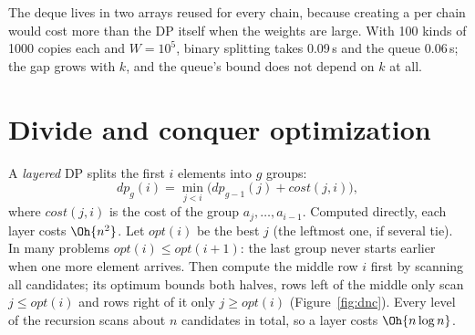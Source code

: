 The deque lives in two arrays reused for every chain, because creating a  per chain would cost more than the DP itself
when the weights are large. With 100 kinds of 1000 copies each and $W = 10^5$, binary splitting takes 0.09\,s and the queue 0.06\,s;
the gap grows with $k$, and the queue's bound does not depend on $k$ at all.

\section[Divide and conquer optimization]{Divide and conquer optimization \hfill \plat}\label{sec:dnc}

A \emph{layered} DP splits the first $i$ elements into $g$ groups:
\[ dp_g(i) = \min_{j < i} \bigl(dp_{g-1}(j) + \mathit{cost}(j, i)\bigr), \]
where $\mathit{cost}(j, i)$ is the cost of the group $a_j, \dots, a_{i-1}$. Computed directly, each layer costs $\Oh{n^2}$. Let
$\mathit{opt}(i)$ be the best $j$ (the leftmost one, if several tie). In many problems $\mathit{opt}(i) \le \mathit{opt}(i + 1)$: the last
group never starts earlier when one more element arrives. Then compute the middle row $i$ first by scanning all candidates; its
optimum bounds both halves, rows left of the middle only scan $j \le \mathit{opt}(i)$ and rows right of it only $j \ge
\mathit{opt}(i)$ (Figure~\ref{fig:dnc}). Every level of the recursion scans about $n$ candidates in total, so a layer costs $\Oh{n \log n}$.

